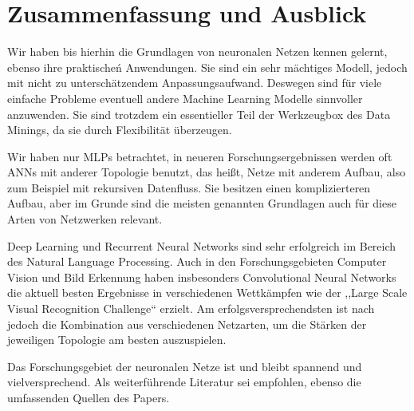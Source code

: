 \section{Zusammenfassung und Ausblick}
Wir haben bis hierhin die Grundlagen von neuronalen Netzen kennen gelernt, ebenso ihre praktischeń Anwendungen. 
Sie sind ein sehr mächtiges Modell, jedoch mit nicht zu unterschätzendem Anpassungsaufwand. Deswegen sind für viele einfache Probleme eventuell andere Machine Learning Modelle sinnvoller anzuwenden. Sie sind trotzdem ein essentieller Teil der Werkzeugbox des Data Minings, da sie durch Flexibilität überzeugen. 

Wir haben nur MLPs betrachtet, in neueren Forschungsergebnissen werden oft ANNs mit anderer Topologie benutzt, das heißt, Netze mit anderem Aufbau, also zum Beispiel mit rekursiven Datenfluss. Sie besitzen einen komplizierteren Aufbau, aber im Grunde sind die meisten genannten Grundlagen auch für diese Arten von Netzwerken relevant. 

Deep Learning und Recurrent Neural Networks sind sehr erfolgreich im Bereich des Natural Language Processing. Auch in den Forschungsgebieten Computer Vision und Bild Erkennung haben insbesonders Convolutional Neural Networks die aktuell besten Ergebnisse in verschiedenen Wettkämpfen wie der  ,,Large Scale Visual Recognition Challenge`` erzielt. Am erfolgsversprechendsten ist nach \cite{LeCun2015} jedoch die Kombination aus verschiedenen Netzarten, um die Stärken der jeweiligen Topologie am besten auszuspielen. 

Das Forschungsgebiet der neuronalen Netze ist und bleibt spannend und vielversprechend. Als weiterführende Literatur sei \cite{LeCun2015} empfohlen, ebenso die umfassenden Quellen des Papers.


